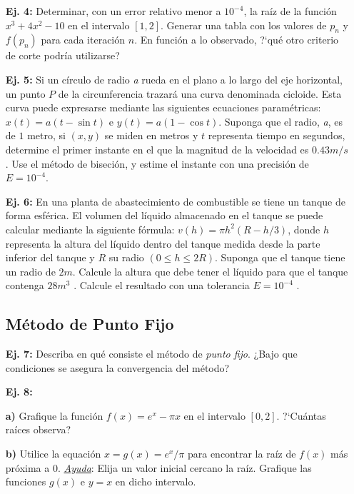 \documentclass[11pt]{article}
\begin{document}
\begin{itemize}
\item[{\bf Ej. 4:}] Determinar, con un error relativo menor a $10^{-4}$, la ra\'iz de la funci\'on $x^3 + 4x^2 -10$ en el intervalo $\left[1,2\right]$. Generar una tabla con los valores de $p_n$ y $f(p_n)$ para cada iteraci\'on $n$. En funci\'on a lo observado, ?`qu\'e otro criterio de corte podr\'ia utilizarse?

\item[{\bf Ej. 5:}] Si un c\'irculo de radio \textit{a} rueda en el plano a lo largo del eje horizontal, un punto $P$ de la circunferencia trazar\'a una curva denominada cicloide. Esta curva puede expresarse mediante las siguientes ecuaciones param\'etricas: $x(t) = a(t - \sin t)$ e $y(t) = a(1 -\cos t)$. Suponga que el radio, \textit{a}, es de $1$ metro, si $(x, y)$ se miden en metros y $t$ representa tiempo en segundos, determine el primer instante en el que la magnitud de la velocidad es $0.43 m{/}s$. Use el m\'etodo de biseci\'on, y estime el instante con una precisi\'on de $E=10^{-4}$.

\item[{\bf Ej. 6:}] En una planta de abastecimiento de combustible se tiene un tanque de forma esf\'erica. El volumen del l\'iquido almacenado en el tanque se puede calcular mediante la siguiente f\'ormula: $v(h) = \pi h^2 (R-h{/} 3 )$, donde $h$ representa la altura del l\'iquido dentro del tanque medida desde la parte inferior del tanque y $R$ su radio $(0 \leq h \leq 2R)$. Suponga que el tanque tiene un radio de $2 m$. Calcule la altura que debe tener el l\'iquido para que el tanque contenga $28 m^3$ . Calcule el resultado con una tolerancia $E=10^{-4}$ .

\subsection*{ M\'etodo de Punto Fijo}


\item[{\bf Ej. 7:}] Describa en qu\'e consiste el m\'etodo de \textit{punto fijo}. ¿Bajo que condiciones se asegura la convergencia del m\'etodo?

\item[{\bf Ej. 8:}] 

\item[{\bf a)}] Grafique la funci\'on $f(x)= e^x-\pi x$ en el intervalo $[0,2]$. ?`Cu\'antas ra\'ices observa?

\item[{\bf b)}] Utilice la equaci\'on $x=g(x)=e^x{/}\pi$ para encontrar la ra\'iz de $f(x)$ m\'as pr\'oxima a $0$. \underline{\textit{Ayuda}}: Elija un valor inicial cercano la ra\'iz. Grafique las funciones $g(x)$ e $y=x$ en dicho intervalo.


\end{itemize}
\end{document}

